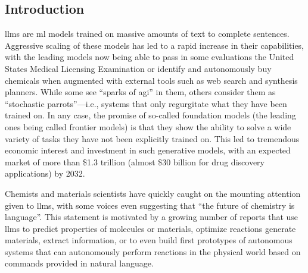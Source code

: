 \documentclass[11pt, oneside]{article}
\begin{document}
\clearpage
\begin{refsection}
\section{Introduction}
\Glspl{llm} are \gls{ml} models trained on massive amounts of text to complete sentences. 
Aggressive scaling of these models has led to a rapid increase in their capabilities,\autocite{brown2020language,zhong2024benchmarking} with the leading models now being able to pass in some evaluations the United States Medical Licensing Examination\autocite{kung2023performance} or identify and autonomously buy chemicals when augmented with external tools such as web search and synthesis planners.\autocite{openai2024gpt4}
While some see \enquote{sparks of \gls{agi}} in them,\autocite{bubeck2023sparks} others consider them as \enquote{stochastic parrots}---i.e., systems that only regurgitate what they have been trained on.\autocite{bender2021dangers}
In any case, the promise of so-called foundation models (the leading ones being called frontier models) is that they show the ability to solve a wide variety of tasks they have not been explicitly trained on.\autocite{bommasani2021opportunities, anderljung2023frontier}
This led to tremendous economic interest and investment in such generative models, with an expected market of more than \$1.3 trillion (almost \$30 billion for drug discovery applications) by 2032.\autocite{bloomberg}

Chemists and materials scientists have quickly caught on the mounting attention given to \glspl{llm}, with some voices even suggesting that \enquote{the future of chemistry is language}.\autocite{White_2023}
This statement is motivated by a growing number of reports that use \glspl{llm} to predict properties of molecules or materials,\autocite{jablonka202314, jablonka2024leveraging, xie2024fine, liao2024words, zhang2024chemllm, zhong2024benchmarking}  optimize reactions\autocite{ramos2023bayesian, kristiadi2024sober}  generate materials,\autocite{rubungo2023llm, flam2023language, gruver2024fine} extract information,\autocite{Patiny_2023, Dagdelen_2024, Zheng_2024, lála2023paperqa, caufield2023structured} or to even build first prototypes of autonomous systems that can autonomously perform reactions in the physical world based on commands provided in natural language.\autocite{bran2023chemcrow, Boiko_2023, darvish2024organa}


\end{refsection}
\end{document}
